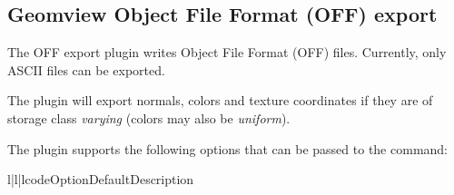 
\subsection{Geomview Object File Format (OFF) export}

The OFF export plugin writes  
Object File Format (OFF) files. Currently, only ASCII files can be 
exported.

The plugin will export normals, colors and texture coordinates if they
are of storage class {\em varying} (colors may also be {\em uniform}).

The plugin supports the following options that can be passed to
the  command:

\begin{tableiii}{l|l|l}{code}{Option}{Default}{Description}
\end{tableiii}

